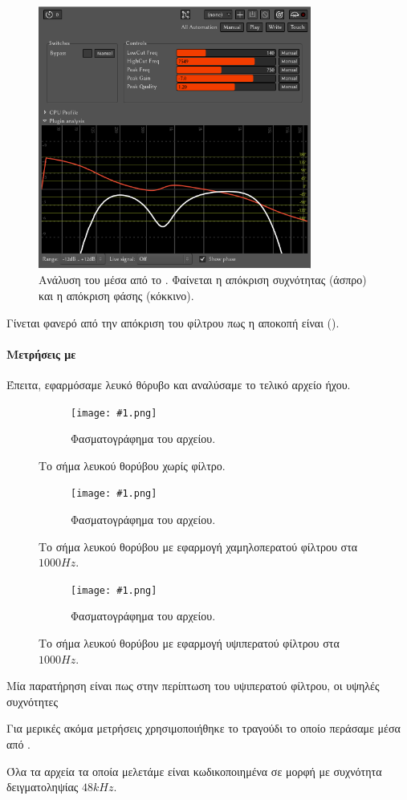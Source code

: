 \documentclass[12pt]{extarticle}
\newcommand{\filterspectrums}[2]
{
\begin{figure}
     \centering
     \begin{subfigure}[b]{\textwidth}
         \centering
         \texttt{[image: \#1.png]}
         \caption{Φασματογράφημα του αρχείου.}
     \end{subfigure}
     \hfill
     \hfill
        \caption{#2}
\end{figure}
}
\begin{document}
\begin{figure}[htpb]
    \centering
    \includegraphics[width=0.8\textwidth]{./assets/PluginAnalysisArdour.png}
    \caption{Ανάλυση του  μέσα από το . Φαίνεται η απόκριση συχνότητας (άσπρο) και η απόκριση φάσης (κόκκινο).}
    \label{fig:ardour_analysis}
\end{figure}

Γίνεται φανερό από την απόκριση του φίλτρου πως η αποκοπή 
είναι  (). 

\paragraph{Μετρήσεις με }
Έπειτα, εφαρμόσαμε λευκό θόρυβο και αναλύσαμε το τελικό αρχείο ήχου.

\filterspectrums{./assets/WhiteNoise}{Το σήμα λευκού θορύβου χωρίς φίλτρο.}
\filterspectrums{./assets/WhiteNoiseLP}{Το σήμα λευκού θορύβου με εφαρμογή χαμηλοπερατού φίλτρου στα $1000Hz$.}
\filterspectrums{./assets/WhiteNoiseHP}{Το σήμα λευκού θορύβου με εφαρμογή υψιπερατού φίλτρου στα $1000Hz$.}

Μία παρατήρηση είναι πως στην περίπτωση του υψιπερατού φίλτρου, οι υψηλές συχνότητες 

Για μερικές ακόμα μετρήσεις χρησιμοποιήθηκε το τραγούδι  
το οποίο περάσαμε μέσα από . 

Όλα τα αρχεία τα οποία μελετάμε είναι κωδικοποιημένα σε μορφή  με συχνότητα δειγματοληψίας $48kHz$.
\end{document}
